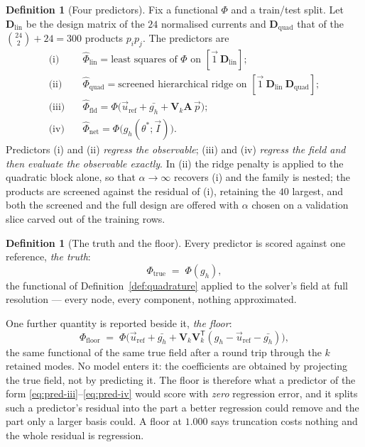 \documentclass[11pt,a4paper]{article}
\newcommand{\vect}[1]{\mathbf{#1}}
\theoremstyle{plain}
\theoremstyle{definition}
\newtheorem{definition}[proposition]{Definition}
\theoremstyle{remark}
\begin{document}
\begin{definition}[Four predictors]
\label{def:predictors}
Fix a functional $\Phi$ and a train/test split. Let $\vect{D}_{\mathrm{lin}}$ be
the design matrix of the $24$ normalised currents and $\vect{D}_{\mathrm{quad}}$
that of the $\binom{24}{2}+24 = 300$ products $p_ip_j$. The predictors are
\begin{align}
\text{(i)}   &\quad \widehat{\Phi}_{\mathrm{lin}}
= \text{least squares of } \Phi \text{ on } [\vec{1}\ \vect{D}_{\mathrm{lin}}];
\label{eq:pred-i}\\
\text{(ii)}  &\quad \widehat{\Phi}_{\mathrm{quad}}
= \text{screened hierarchical ridge on } [\vec{1}\ \vect{D}_{\mathrm{lin}}\ \vect{D}_{\mathrm{quad}}];
\label{eq:pred-ii}\\
\text{(iii)} &\quad \widehat{\Phi}_{\mathrm{fld}} = \Phi\bigl(\vec{u}_{\mathrm{ref}}+\bar{g_h}+\vect{V}_k\vect{A}\,\vec{p}\bigr);
\label{eq:pred-iii}\\
\text{(iv)}  &\quad \widehat{\Phi}_{\mathrm{net}} = \Phi\bigl(g_h(\theta^*;\vec{I})\bigr).
\label{eq:pred-iv}
\end{align}
Predictors (i) and (ii) \emph{regress the observable}; (iii) and (iv)
\emph{regress the field and then evaluate the observable exactly}. In (ii) the
ridge penalty is applied to the quadratic block alone, so that
$\alpha\to\infty$ recovers (i) and the family is nested; the products are
screened against the residual of (i), retaining the $40$ largest, and both the
screened and the full design are offered with $\alpha$ chosen on a validation
slice carved out of the training rows.
\end{definition}

\begin{definition}[The truth and the floor]
\label{def:truths}
Every predictor is scored against one reference, \emph{the truth}:
\[
  \Phi_{\mathrm{true}} \;=\; \Phi(g_h),
\]
the functional of Definition~\ref{def:quadrature} applied to the solver's field
at full resolution --- every node, every component, nothing approximated.

One further quantity is reported beside it, \emph{the floor}:
\[
  \Phi_{\mathrm{floor}} \;=\;
  \Phi\bigl(\vec{u}_{\mathrm{ref}}+\bar{g_h}+\vect{V}_k\vect{V}_k^{\mathsf{T}}
  (g_h-\vec{u}_{\mathrm{ref}}-\bar{g_h})\bigr),
\]
the same functional of the same true field after a round trip through the $k$
retained modes. No model enters it: the coefficients are obtained by projecting
the true field, not by predicting it. The floor is therefore what a predictor of
the form \eqref{eq:pred-iii}--\eqref{eq:pred-iv} would score with \emph{zero}
regression error, and it splits such a predictor's residual into the part a
better regression could remove and the part only a larger basis could. A floor
at $1.000$ says truncation costs nothing and the whole residual is regression.
\end{definition}
\end{document}
